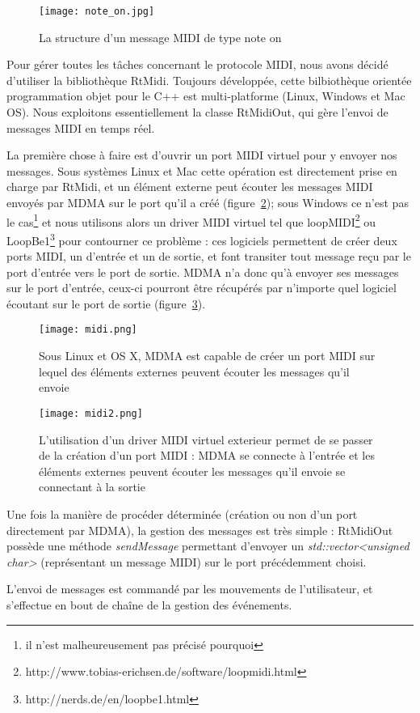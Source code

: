 \begin{figure}
    \centering
    \texttt{[image: note\_on.jpg]}
    \caption{La structure d'un message MIDI de type note on}
    \label{note_on}
\end{figure}
\par Pour gérer toutes les tâches concernant le protocole MIDI, nous avons décidé d'utiliser la bibliothèque RtMidi. Toujours développée, cette bilbiothèque orientée programmation objet pour le C++ est multi-platforme (Linux, Windows et Mac OS). Nous exploitons essentiellement la classe RtMidiOut, qui gère l'envoi de messages MIDI en temps réel.
\par La première chose à faire est d’ouvrir un port MIDI virtuel pour y envoyer nos messages. Sous systèmes Linux et Mac cette opération est directement prise en charge par RtMidi, et un élément externe peut écouter les messages MIDI envoyés par MDMA sur le port qu'il a créé (figure~\ref{MDMA_port}); sous Windows ce n’est pas le cas\footnote{il n'est malheureusement pas précisé pourquoi} et nous utilisons alors un driver MIDI virtuel tel que loopMIDI\footnote{http://www.tobias-erichsen.de/software/loopmidi.html} ou LoopBe1\footnote{http://nerds.de/en/loopbe1.html} pour contourner ce problème : ces logiciels permettent de créer deux ports MIDI, un d’entrée et un de sortie, et font transiter tout message reçu par le port d’entrée vers le port de sortie. MDMA n’a donc qu’à envoyer ses messages sur le port d’entrée, ceux-ci pourront être  récupérés par n’importe quel logiciel écoutant sur le port de sortie (figure~\ref{External_port}).
\begin{figure}[h]
    \centering
    \texttt{[image: midi.png]}
    \caption{Sous Linux et OS X, MDMA est capable de créer un port MIDI sur lequel des éléments externes peuvent écouter les messages qu'il envoie}
    \label{MDMA_port}
\end{figure}
\begin{figure}[h]
    \centering
    \texttt{[image: midi2.png]}
    \caption{L'utilisation d'un driver MIDI virtuel exterieur permet de se passer de la création d'un port MIDI : MDMA se connecte à l'entrée et les éléments externes peuvent écouter les messages qu'il envoie se connectant à la sortie}
    \label{External_port}
\end{figure}
\par Une fois la manière de procéder déterminée (création ou non d'un port directement par MDMA), la gestion des messages est très simple : RtMidiOut possède une méthode \emph{sendMessage} permettant d'envoyer un \emph{std::vector<unsigned char>} (représentant un message MIDI) sur le port précédemment choisi.
\par L'envoi de messages est commandé par les mouvements de l'utilisateur, et s'effectue en bout de chaîne de la gestion des événements.
